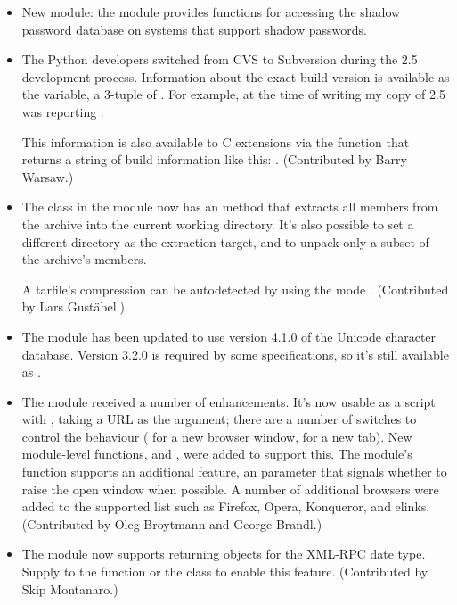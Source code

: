 \documentclass{howto}
\begin{document}
\begin{itemize}
\item New module: the  module provides functions for
accessing the shadow password database on systems that support 
shadow passwords.

\item The Python developers switched from CVS to Subversion during the 2.5
development process.  Information about the exact build version is 
available as the  variable, a 3-tuple
of .
For example, at the time of writing 
my copy of 2.5 was reporting .

This information is also available to C extensions via the 
 function that returns a 
string of build information like this:
.  
(Contributed by Barry Warsaw.)

\item The  class in the  module now has
an  method that extracts all members from the
archive into the current working directory.  It's also possible to set
a different directory as the extraction target, and to unpack only a
subset of the archive's members.  

A tarfile's compression can be autodetected by 
using the mode .
(Contributed by Lars Gust\"abel.)

\item The  module has been updated to use version 4.1.0
of the Unicode character database.  Version 3.2.0 is required 
by some specifications, so it's still available as 
.

\item The  module received a number of
enhancements.
It's now usable as a script with , taking a
URL as the argument; there are a number of switches 
to control the behaviour ( for a new browser window, 
 for a new tab).  New module-level functions,
 and , were added 
to support this.  The module's  function supports an
additional feature, an  parameter that signals whether
to raise the open window when possible. A number of additional
browsers were added to the supported list such as Firefox, Opera,
Konqueror, and elinks.  (Contributed by Oleg Broytmann and George
Brandl.)


\item The  module now supports returning 
       objects for the XML-RPC date type.  Supply 
       to the  function
      or the  class to enable this feature.
      (Contributed by Skip Montanaro.)


\end{itemize}
\end{document}
